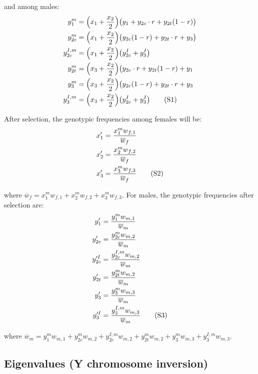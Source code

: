 \documentclass[11pt]{article}
\newcommand\numberthis{\addtocounter{equation}{1}\tag{\theequation}}
\begin{document}
\noindent and among males:
\begin{align*}
	y^m_{1}      &= \Big( x_1 + \frac{x_2}{2} \Big) \big(y_1 + y_{2c} \cdot r + y_{2t}(1 - r)  \big) \\
	y^m_{2c}     &= \Big( x_1 + \frac{x_2}{2} \Big) \big( y_{2c} (1 - r) + y_{2t} \cdot r + y_3 \big) \\
	y^{I,m}_{2c} &= \Big( x_1 + \frac{x_2}{2} \Big) \big(y^I_{2c} + y^I_{3} \big)  \\
	y^m_{2t}     &= \Big( x_3 + \frac{x_2}{2} \Big) \big( y_{2c} \cdot r + y_{2t}(1 - r) + y_1 \\
	y^m_{3}      &= \Big( x_3 + \frac{x_2}{2} \Big) \big( y_{2c}(1 - r) + y_{2t} \cdot r + y_3 \\
	y^{I,m}_{3}  &= \Big( x_3 + \frac{x_2}{2} \Big) \big(y^I_{2c} + y^I_{3} \big)  \numberthis
\end{align*}

\noindent After selection, the genotypic frequencies among females will be:
\begin{align*}
	x'_{1} &= \frac{x^m_1 w_{f,1}}{\overline{w}_{f}}\\
	x'_{2} &= \frac{x^m_2 w_{f,2}}{\overline{w}_{f}}\\
	x'_{3} &= \frac{x^m_3 w_{f,3}}{\overline{w}_{f}} \numberthis
\end{align*}

\noindent where $\overline{w}_{f} = x^m_1 w_{f,1} + x^m_2 w_{f,2} + x^m_3 w_{f,3}$. For males, the genotypic frequencies after selection are:
\begin{align*}
	y'_{1}       &= \frac{y^m_1 w_{m,1}}{\overline{w}_{m}} \\
	y'_{2c}      &= \frac{y^m_{2c} w_{m,2}}{\overline{w}_{m}} \\
	y'^{I}_{2c}  &= \frac{y^{I,m}_{2c} w_{m,2}}{\overline{w}_{m}}  \\
	y'_{2t}      &= \frac{y^m_{2t} w_{m,2}}{\overline{w}_{m}} \\
	y'_{3}       &= \frac{y^m_3 w_{m,3}}{\overline{w}_{m}} \\
	y'^{I}_{3}   &= \frac{y^{I,m}_3 w_{m,3}}{\overline{w}_{m}} \numberthis
\end{align*}

\noindent where $\overline{w}_{m} = y^m_1 w_{m,1} + y^m_{2c} w_{m,2} + y^{I,m}_{2c} w_{m,2} + y^m_{2t} w_{m,2} + y^m_3 w_{m,3} + y^{I,m}_3 w_{m,3}$.



\subsection{Eigenvalues (Y chromosome inversion)}
\end{document}

